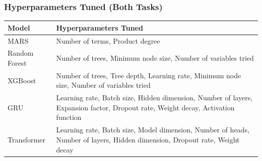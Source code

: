 \documentclass{beamer}
\begin{document}
\begin{frame}
\frametitle{Hyperparameters Tuned (Both Tasks)}
    \vspace{-0.5em} %
    \centering %
    \begin{tabular}{>{\columncolor{bgsubrown!20}}m{} >{\arraybackslash}m{}}
    \toprule
    \textbf{Model} & \textbf{Hyperparameters Tuned} \\
    \midrule
    MARS & Number of terms, Product degree \\
    \midrule
    Random Forest & Number of trees, Minimum node size, Number of variables tried \\
    \midrule
    XGBoost & Number of trees, Tree depth, Learning rate, Minimum node size, Number of variables tried \\
    \midrule
    GRU & Learning rate, Batch size, Hidden dimension, Number of layers, Expansion factor, Dropout rate, Weight decay, Activation function \\
    \midrule
    Transformer & Learning rate, Batch size, Model dimension, Number of heads, Number of layers, Hidden dimension, Dropout rate, Weight decay \\
    \bottomrule
    \end{tabular}
\end{frame}
\end{document}
